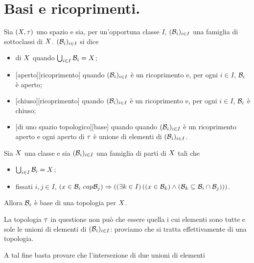 \section{Basi e ricoprimenti.}\label{BasiERicoprimenti}
\begin{Definition}
	Sia $(X,\tau)$ uno spazio e sia, per
	un'opportuna classe $I$, $(\mathcal{B}_i)_{i \in I}$ una
	famiglia di sottoclassi di $X$.
	$(\mathcal{B}_i)_{i \in I}$ si dice
	\begin{itemize}
		\item {} di $X$ quando
		$\bigcup_{i \in I} \mathcal{B}_i =
		X$;
		\item {}[aperto][ricoprimento]
		quando $(\mathcal{B}_i)_{i \in I}$ \`e un
		ricoprimento e, per ogni $i \in I$, $\mathcal{B}_i$
		\`e aperto;
		\item {}[chiuso][ricoprimento]
		quando $(\mathcal{B}_i)_{i \in I}$ \`e un
		ricoprimento e, per ogni $i \in I$, $\mathcal{B}_i$
		\`e chiuso;
		\item {}[di uno spazio topologico][base] quando
		quando $(\mathcal{B}_i)_{i \in I}$ \`e un
		ricoprimento aperto e ogni aperto di $\tau$ \`e
		unione di elementi di $(\mathcal{B}_i)_{i \in I}$.
	\end{itemize} 
\end{Definition}
\begin{Theorem}\label{th_BaseDiUnaTopologia}
	Sia $X$ una classe e sia
	$(\mathcal{B}_i)_{i \in I}$ una famiglia di parti di
	$X$ tali che
	\begin{itemize}
		\item $\bigcup_{i \in I} \mathcal{B}_i =
		X$;
		\item fissati $i, j \in I$, $\left ( x \in
		\mathcal{B}_i \ cap \mathcal{B}_j \right ) \Rightarrow \left ( \left ( \exists k \in
		I \right ) \left ( \left ( x \in \mathcal{B}_k \right ) \wedge \left ( \mathcal{B}_k
		\subseteq \mathcal{B}_i \cap \mathcal{B}_j \right ) \right ) \right )$.
	\end{itemize}
	Allora $\mathcal{B}_i$ \`e base di una topologia per
	$X$.
\end{Theorem}
\Proof La topologia $\tau$ in questione non pu\`o che essere quella i
cui elementi sono tutte e sole le unioni di elementi di
$(\mathcal{B}_i)_{i \in I}$: proviamo che si tratta effettivamente di
una topologia.
\par A tal fine basta provare che l'intersezione di due unioni di elementi
